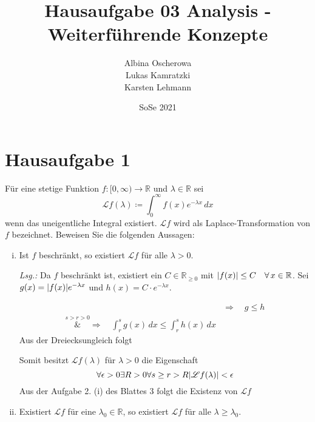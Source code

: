 \documentclass{article}
\author{Albina Oscherowa \\ Lukas Kamratzki \\ Karsten Lehmann}
\date{SoSe 2021}
\title{Hausaufgabe 03 Analysis - Weiterführende Konzepte}
\begin{document}
\section*{Hausaufgabe 1}

Für eine stetige Funktion $f \colon [0, \infty) \to \mathbb{R}$ und
$\lambda \in \mathbb{R}$ sei
\[
  \mathscr{L}f(\lambda) \coloneqq \int_0^{\infty} f(x)e^{-\lambda x}\,dx
\]
wenn das uneigentliche Integral existiert.
$\mathscr{L}f$ wird als Laplace-Transformation von $f$ bezeichnet.
Beweisen Sie die folgenden Aussagen:
\begin{enumerate}[(i)]
\item Ist $f$ beschränkt, so existiert $\mathscr{L}f$ für alle $\lambda > 0$.

  \textit{Lsg.:} Da $f$ beschränkt ist, existiert ein $C \in \mathbb{R}_{\geq 0}$
  mit $\abs{f(x)} \leq C \quad \forall \, x \in \mathbb{R}$.
  Sei $g(x) = \abs{f(x)} e^{-\lambda x}$ und $h(x) = C \cdot e^{-\lambda x}$.
  
  \begin{align*}
    &\Rightarrow \quad g \leq  h  \\
    \overset{s > r > 0}&\Rightarrow \quad \int_r^s g(x)\,dx \leq \int_r^s h(x)\,dx
  \end{align*}
  Aus der Dreiecksungleich folgt
  Somit besitzt $\mathscr{L}f(\lambda)$ für $\lambda > 0$ die Eigenschaft
  \[
    \forall \epsilon > 0 \exists R > 0 \forall s \geq r > R \abs{\mathscr{L}f(\lambda)} < \epsilon
  \]
  Aus der Aufgabe 2. (i) des Blattes 3 folgt die Existenz von $\mathscr{L}f$

\newpage
\item Existiert $\mathscr{L}f$ für eine $\lambda_0 \in \mathbb{R}$, so existiert
  $\mathscr{L}f$ für alle $\lambda \geq \lambda_0$.


\end{enumerate}
\end{document}
